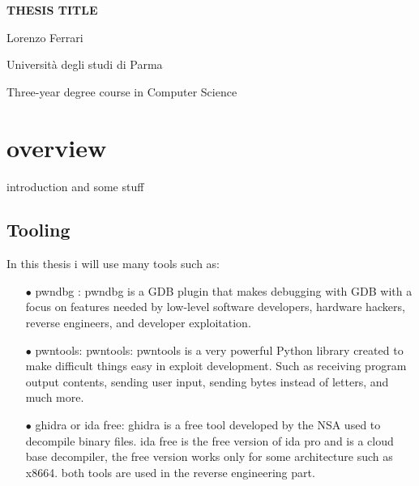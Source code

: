 \documentclass{report}
\begin{document}
\begin{titlepage}
    \centering
    \vspace*{\fill}
    \Huge \textbf{THESIS TITLE}
    \vspace{2cm} 
    
    \Large Lorenzo Ferrari

    \vspace{2cm} %
    
    \Large Università degli studi di Parma
    \par
    Three-year degree course in Computer Science
    
 
\end{titlepage}

\renewcommand{\contentsname}{Index}
\tableofcontents
    
    
    
    \chapter{overview}
    introduction and some stuff
    \section{Tooling}
    In this thesis i will use many tools such as: 
       \begin{itemize}
        \item[$\bullet$] pwndbg : pwndbg is a GDB plugin that makes debugging with GDB with a focus on features needed by low-level software developers, hardware hackers, reverse engineers, and developer exploitation.
        \item[$\bullet$]pwntools: pwntools: pwntools is a very powerful Python library created to make difficult things easy in exploit development.\newline
        Such as receiving program output contents, sending user input, sending bytes instead of letters, and much more.\newline
        \item[$\bullet$] ghidra or ida free: 
        ghidra is a free tool developed by the NSA used to decompile binary files.
        ida free is the free version of ida pro and is a cloud base decompiler, the free version works only for some architecture such as x8664.\newline
        both tools are used in the reverse engineering part.\newline

    \end{itemize}
    
\end{document}
